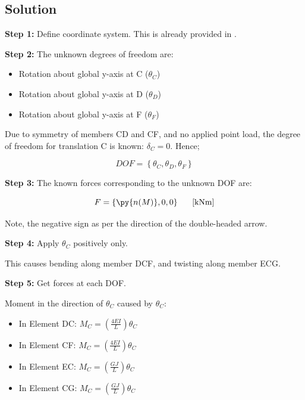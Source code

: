 \documentclass[a4paper,11pt]{article}
\begin{document}
\begin{hidden}	
\clearpage
\section{Solution}

\textbf{Step 1:} Define coordinate system. This is already provided in . 

\textbf{Step 2:} The unknown degrees of freedom are: 

\begin{itemize}
	\item Rotation about global y-axis at C ($\theta_C$)
	\item Rotation about global y-axis at D ($\theta_D$)
	\item Rotation about global y-axis at F ($\theta_F$)
\end{itemize} 

Due to symmetry of members CD and CF, and no applied point load, the degree of freedom for translation C is known: $\delta_C = 0$. Hence; 

\begin{equation}
	DOF = \left\{\theta_C,\theta_D,\theta_F\right\}
\end{equation}

\textbf{Step 3:} The known forces corresponding to the unknown DOF are: 

\begin{equation}
	F = \left\{ \py{n(M)},0,0 \right\} \textrm{\hspace{0.5cm} [kNm]}
\end{equation}

Note, the negative sign as per the direction of the double-headed arrow. 
	
\textbf{Step 4:} Apply $\theta_C$ positively only. 

This causes bending along member DCF, and twisting along member ECG. 

\textbf{Step 5:} Get forces at each DOF. 

Moment in the direction of $\theta_C$ caused by $\theta_C$: 

\begin{itemize}
	\item In Element DC: $M_C = \left(\frac{4EI}{L}\right)\theta_C$
	\item In Element CF: $M_C = \left(\frac{4EI}{L}\right)\theta_C$
	\item In Element EC: $M_C = \left(\frac{GJ}{L}\right)\theta_C$
	\item In Element CG: $M_C = \left(\frac{GJ}{L}\right)\theta_C$
\end{itemize}	


\end{hidden}
\end{document}
